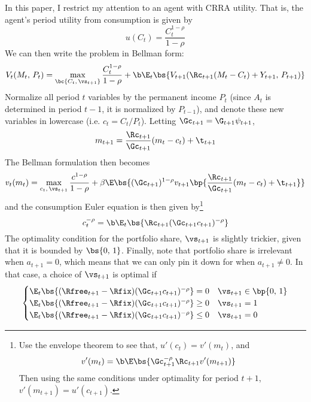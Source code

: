 In this paper, I restrict my attention to an agent with CRRA utility. That is, the agent's period utility from consumption is given by
\[
u(C_t) = \frac{C_t^{1-\rho}}{1-\rho}
\]
We can then write the problem in Bellman form:
\begin{equation}
    V_t(M_t,\,P_t) = \max_{\bc{C_t,\,\vs_{t+1}}}\frac{C_{t}^{1-\rho}}{1 - \rho} + \b \E_t\bs{V_{t+1}(\Rc_{t+1}(M_t - C_{t}) + Y_{t+1},\,P_{t+1})}
\end{equation}
Normalize all period $t$ variables by the permanent income $P_t$ (since $A_t$ is determined in period $t-1$, it is normalized by $P_{t-1}$), and denote these new variables in lowercase (i.e. $c_t = C_t / P_t$). Letting $\Gc_{t+1} = \G_{t+1}\psi_{t+1}$,
\begin{align*}
    m_{t+1} = \frac{\Rc_{t+1}}{\Gc_{t+1}}(m_t - c_t) + \t_{t+1}
\end{align*}
The Bellman formulation then becomes
\begin{equation}\label{eq:bellman}
    v_{t}(m_t) = \max_{c_{t},\,\vs_{t+1}}\frac{c^{1-\rho}}{1-\rho} + \beta \E\bs{(\Gc_{t+1})^{1-\rho}v_{t+1}\bp{\frac{\Rc_{t+1}}{\Gc_{t+1}}(m_t - c_t) + \t_{t+1}}}
\end{equation}
and the consumption Euler equation is then given by\footnote{Use the envelope theorem to see that, $u'(c_t) = v'(m_t)$, and
\begin{align*}
    v'(m_t) &= \b \E\bs{\Gc_{t+1}^{-\rho}\Rc_{t+1}v'(m_{t+1})}
\end{align*}
Then using the same conditions under optimality for period $t+1$, $v'(m_{t+1}) = u'(c_{t+1})$.
}
\begin{equation}\label{eq:euler}
    c_t^{-\rho} = \b \E_{t}\bs{\Rc_{t+1}(\Gc_{t+1}c_{t+1})^{-\rho}}
\end{equation}
The optimality condition for the portfolio share, $\vs_{t+1}$ is slightly trickier, given that it is bounded by $\bs{0,\,1}$. Finally, note that portfolio share is irrelevant when $a_{t+1} = 0$, which means that we can only pin it down for when $a_{t+1} \neq 0$. In that case, a choice of $\vs_{t+1}$ is optimal if
\begin{equation}\label{eq:excess_return}
    \begin{cases}
        \E_{t}\bs{(\Rfree_{t+1} - \Rfix)(\Gc_{t+1}c_{t+1})^{-\rho}} = 0 & \vs_{t+1} \in \bp{0,\,1}\\
        \E_{t}\bs{(\Rfree_{t+1} - \Rfix)(\Gc_{t+1}c_{t+1})^{-\rho}} \geq 0 & \vs_{t+1} = 1\\
        \E_{t}\bs{(\Rfree_{t+1} - \Rfix)(\Gc_{t+1}c_{t+1})^{-\rho}} \leq 0 & \vs_{t+1} = 0
    \end{cases}
\end{equation}
